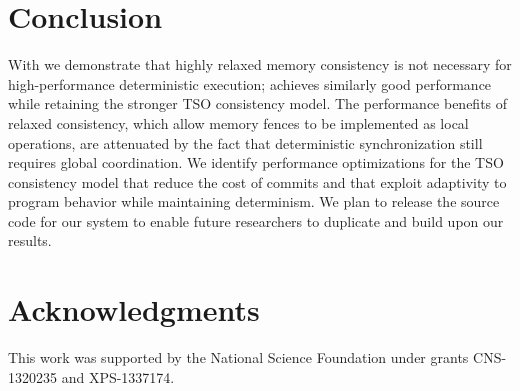 \documentclass[10pt]{sigplanconf}
\begin{document}
\section{Conclusion}
\label{s:concl}
With \lib we demonstrate that highly relaxed memory consistency is not necessary for high-performance deterministic execution; \lib achieves similarly good performance while retaining the stronger TSO consistency model. The performance benefits of relaxed consistency, which allow memory fences to be implemented as local operations, are attenuated by the fact that deterministic synchronization still requires global coordination. We identify performance optimizations for the TSO consistency model that reduce the cost of commits and that exploit adaptivity to program behavior while maintaining determinism. We plan to release the source code for our system to enable future researchers to duplicate and build upon our results.

\section{Acknowledgments}

This work was supported by the National Science Foundation under grants
CNS-1320235 and XPS-1337174.















\end{document}
